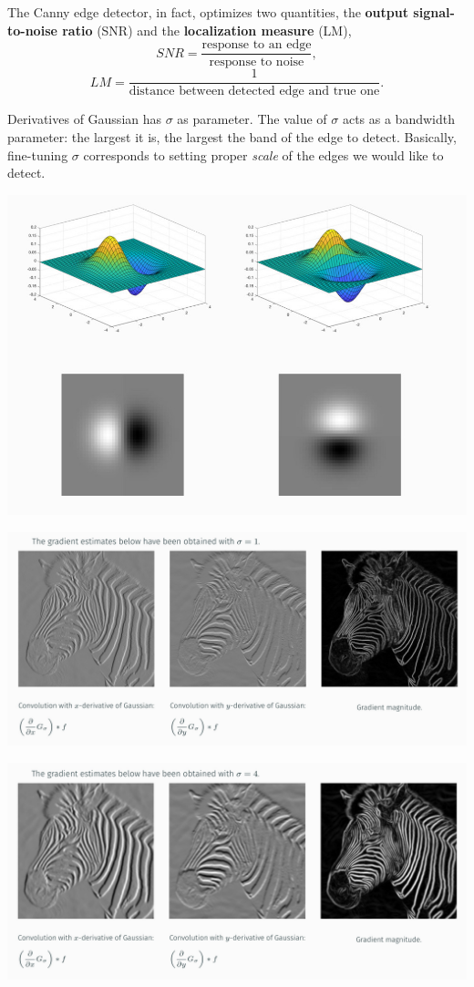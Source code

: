 \documentclass[10pt]{report}
\begin{document}
The Canny edge detector, in fact, optimizes two quantities, the \textbf{output
signal-to-noise ratio} (SNR) and the \textbf{localization measure} (LM),
\[SNR = \frac{\mbox{response to an edge}}{\mbox{response to noise}},\]
\[LM = \frac{1}{\mbox{distance between detected edge and true one}}.\]

Derivatives of Gaussian has \(\sigma\) as parameter. The value of
\(\sigma\) acts as a bandwidth parameter: the largest it is, the largest
the band of the edge to detect. Basically, fine-tuning \(\sigma\)
corresponds to setting proper \emph{scale} of the edges we would like to
detect.

\begin{center}
\includegraphics[width=.9\linewidth]{./pics/det/canny-edge-detector.jpg}
\end{center}

\begin{center}
\includegraphics[width=.9\linewidth]{./pics/det/zebra-2.jpg}
\end{center}

\begin{center}
\includegraphics[width=.9\linewidth]{./pics/det/zebra-3.jpg}
\end{center}
\end{document}
